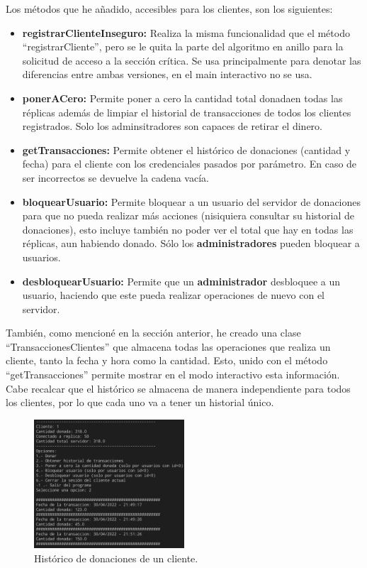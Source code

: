 \documentclass{article}
\begin{document}
Los métodos que he añadido, accesibles para los clientes, son los siguientes:

\begin{itemize}
    \item \textbf{registrarClienteInseguro: }Realiza la misma funcionalidad que el método ``registrarCliente'', pero se le quita la parte del algoritmo en anillo para la solicitud de acceso a la sección crítica. Se usa principalmente para denotar las diferencias entre ambas versiones, en el main interactivo no se usa.
    \item \textbf{ponerACero: }Permite poner a cero la cantidad total donadaen todas las réplicas además de limpiar el historial de transacciones de todos los clientes registrados. Solo los adminsitradores son capaces de retirar el dinero.
    \item \textbf{getTransacciones: }Permite obtener el histórico de donaciones (cantidad y fecha) para el cliente con los credenciales pasados por parámetro. En caso de ser incorrectos se devuelve la cadena vacía.
    \item \textbf{bloquearUsuario: }Permite bloquear a un usuario del servidor de donaciones para que no pueda realizar más acciones (nisiquiera consultar su historial de donaciones), esto incluye también no poder ver el total que hay en todas las réplicas, aun habiendo donado. Sólo los \textbf{administradores} pueden bloquear a usuarios.
    \item \textbf{desbloquearUsuario: }Permite que un \textbf{administrador} desbloquee a un usuario, haciendo que este pueda realizar operaciones de nuevo con el servidor.
\end{itemize}

También, como mencioné en la sección anterior, he creado una clase ``TransaccionesClientes'' que almacena todas las operaciones que realiza un cliente, tanto la fecha y hora como la cantidad. Esto, unido con el método ``getTransacciones'' permite mostrar en el modo interactivo esta información. Cabe recalcar que el histórico se almacena de manera independiente para todos los clientes, por lo que cada uno va a tener un historial único.

\begin{figure}[H]
    \centering
    \includegraphics[width=0.5\textwidth]{imagenes/historico.png}
    \caption{Histórico de donaciones de un cliente.}
\end{figure}
\end{document}
